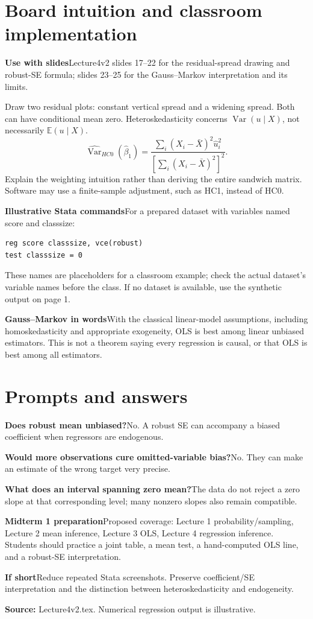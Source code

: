 \documentclass[11pt,a4paper]{article}
\newcommand{\heading}[1]{\section*{\color{accent}#1}}
\newcommand{\cue}[2]{\par\noindent\textbf{#1}\quad #2\par}
\newcommand{\E}{\mathbb{E}}
\newcommand{\Var}{\operatorname{Var}}
\begin{document}
\newpage
\heading{Board intuition and classroom implementation}
\cue{Use with slides}{Lecture4v2 slides 17--22 for the residual-spread drawing and robust-SE formula; slides 23--25 for the Gauss--Markov interpretation and its limits.}
Draw two residual plots: constant vertical spread and a widening spread. Both can have conditional mean zero. Heteroskedasticity concerns $\Var(u\mid X)$, not necessarily $\E(u\mid X)$.
\[
\widehat{\Var}_{HC0}(\hat\beta_1)=
\frac{\sum_i(X_i-\bar X)^2\hat u_i^2}
{\left[\sum_i(X_i-\bar X)^2\right]^2}.
\]
Explain the weighting intuition rather than deriving the entire sandwich matrix. Software may use a finite-sample adjustment, such as HC1, instead of HC0.
\cue{Illustrative Stata commands}{For a prepared dataset with variables named score and classsize:}
\begin{verbatim}
reg score classsize, vce(robust)
test classsize = 0
\end{verbatim}
These names are placeholders for a classroom example; check the actual dataset's variable names before the class. If no dataset is available, use the synthetic output on page 1.
\cue{Gauss--Markov in words}{With the classical linear-model assumptions, including homoskedasticity and appropriate exogeneity, OLS is best among linear unbiased estimators. This is not a theorem saying every regression is causal, or that OLS is best among all estimators.}
\heading{Prompts and answers}
\cue{Does robust mean unbiased?}{No. A robust SE can accompany a biased coefficient when regressors are endogenous.}
\cue{Would more observations cure omitted-variable bias?}{No. They can make an estimate of the wrong target very precise.}
\cue{What does an interval spanning zero mean?}{The data do not reject a zero slope at that corresponding level; many nonzero slopes also remain compatible.}
\cue{Midterm 1 preparation}{Proposed coverage: Lecture 1 probability/sampling, Lecture 2 mean inference, Lecture 3 OLS, Lecture 4 regression inference. Students should practice a joint table, a mean test, a hand-computed OLS line, and a robust-SE interpretation.}
\cue{If short}{Reduce repeated Stata screenshots. Preserve coefficient/SE interpretation and the distinction between heteroskedasticity and endogeneity.}
\textbf{Source:} Lecture4v2.tex. Numerical regression output is illustrative.
\end{document}
